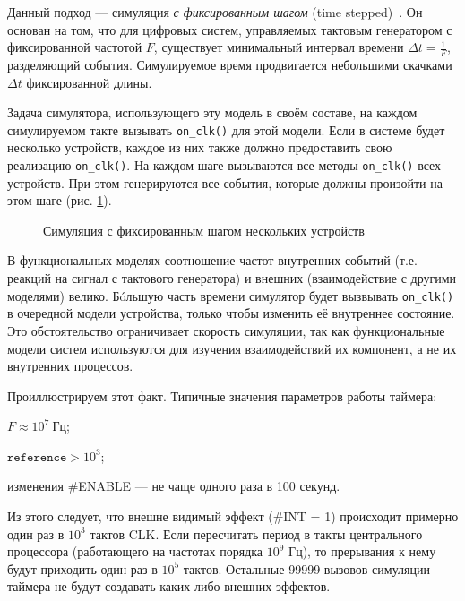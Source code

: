 Данный подход — симуляция \textit{с фиксированным шагом} (\abbr time stepped)~\citep{ferscha-1995-pdes}. Он основан на том, что для цифровых систем, управляемых тактовым генератором с фиксированной частотой $F$, существует минимальный интервал времени $\Delta t = \frac{1}{F}$, разделяющий события. Симулируемое время продвигается небольшими скачками $\Delta t$ фиксированной длины.

Задача симулятора, использующего эту модель в своём составе, на каждом симулируемом такте вызывать \texttt{on_clk()} для этой модели. Если в системе будет несколько устройств, каждое из них также должно предоставить свою реализацию \texttt{on_clk()}. На каждом шаге вызываются все методы \texttt{on_clk()} всех устройств. При этом генерируются все события, которые должны произойти на этом шаге (рис. \ref{fig:time-stepped-sim}).

\begin{figure}[htp]
    \centering
    \caption[Симуляция с фиксированным шагом]{Симуляция с фиксированным шагом нескольких устройств}
    \label{fig:time-stepped-sim}
\end{figure}

В функциональных моделях соотношение частот внутренних событий (т.е. реакций на сигнал с тактового генератора) и внешних (взаимодействие с другими моделями) велико. Бóльшую часть времени симулятор будет вызвывать \texttt{on_clk()} в очередной модели устройства, только чтобы изменить её внутреннее состояние. Это обстоятельство ограничивает скорость симуляции, так как функциональные модели систем используются для изучения взаимодействий их компонент, а не их внутренних процессов.

Проиллюстрируем этот факт. Типичные значения параметров работы таймера:

\begin{itemize*}
    \item $F \approx 10^7\ \text{Гц}$;
    \item $\mathtt{reference} > 10^3$;
    \item изменения \#ENABLE — не чаще одного раза в 100 секунд.
\end{itemize*}

Из этого следует, что внешне видимый эффект (\#INT = 1) происходит примерно один раз в $10^3$ тактов CLK. Если пересчитать период в такты центрального процессора (работающего на частотах порядка $10^9$ Гц), то прерывания к нему будут приходить один раз в $10^5$ тактов. Остальные 99999 вызовов симуляции таймера не будут создавать каких-либо внешних эффектов.


